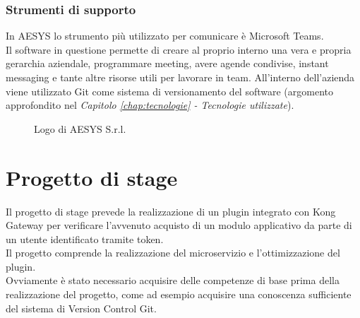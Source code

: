 \subsubsection{Strumenti di supporto}\label{sec:strumentidisupporto}
In AESYS lo strumento più utilizzato per comunicare è Microsoft Teams.\\
Il software in questione permette di creare al proprio interno una vera e propria gerarchia aziendale, programmare meeting, avere agende condivise, instant messaging e tante altre risorse utili per lavorare in team.
All'interno dell'azienda viene utilizzato Git come sistema di versionamento del software (argomento approfondito nel \emph{Capitolo \ref{chap:tecnologie} - Tecnologie utilizzate}).\\

\begin{figure}[ht]
	\centering
	\caption{Logo di AESYS S.r.l.}
	\label{fig:one}
\end{figure}

\section{Progetto di stage}\label{sec:progetto}
Il progetto di stage prevede la realizzazione di un plugin integrato con Kong Gateway per verificare l'avvenuto acquisto di un modulo applicativo da parte 
di un utente identificato tramite token.\\
Il progetto comprende la realizzazione del microservizio e l'ottimizzazione del plugin.\\

Ovviamente è stato necessario acquisire delle competenze di base prima della realizzazione del progetto, come ad esempio acquisire una conoscenza sufficiente del sistema di Version Control Git.

